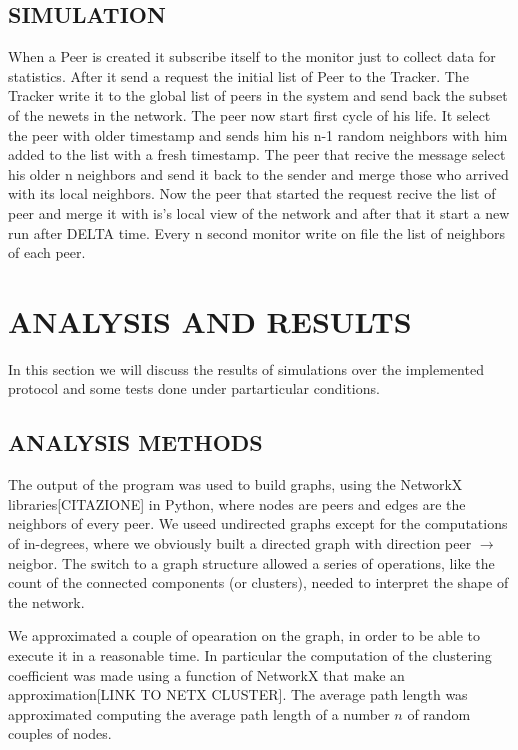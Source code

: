 \documentclass[a4paper,12pt,notitlepage]{article} %
\begin{document}
\subsection{SIMULATION}
	When a Peer is created it subscribe itself to the monitor just to collect data for statistics. After it send a request the initial list of Peer to the Tracker. The Tracker write it to the global list of peers in the system and send back the subset of the newets in the network. The peer now start first cycle of his life. It select the peer with older timestamp and sends him his n-1 random neighbors with him added to the list with a fresh timestamp. The peer that recive the message select his older n neighbors and send it back to the sender and merge those who arrived with its local neighbors. Now the peer that started the request recive the list of peer and merge it with is's local view of the network and after that it start a new run after DELTA time. Every n second monitor write on file the list of neighbors of each peer.





\section{ANALYSIS AND RESULTS}

In this section we will discuss the results of simulations over the implemented protocol and some tests done under
 partarticular conditions.

\subsection{ANALYSIS METHODS}

The output of the program was used to build  graphs, using the NetworkX libraries[CITAZIONE] in Python, where
 nodes are peers and edges are the neighbors of every peer. We useed undirected graphs except for the 
 computations of in-degrees, where we obviously built a directed graph with direction peer \(\rightarrow\) neigbor.
 The switch to a graph structure allowed a series of operations, like the count of the connected components (or clusters), 
 needed to interpret the shape of the network.

We approximated a couple of opearation on the graph, in order to be able to execute it in a reasonable time. In 
 particular the computation of the clustering coefficient was made using a function of NetworkX that make an approximation[LINK TO NETX CLUSTER]. The average path length was approximated computing the average path length of a number \(n\) of random couples of nodes.
\end{document}
